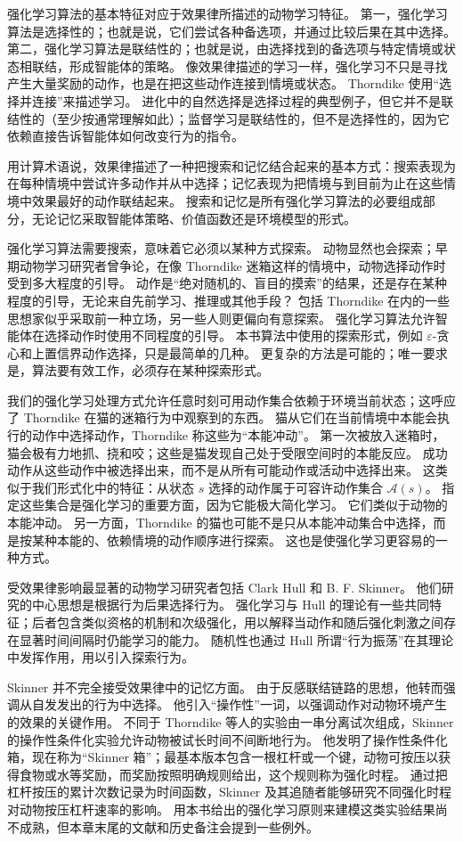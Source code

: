 \documentclass[UTF8, 12pt, fontset=fandol, oneside]{ctexart}
\begin{document}
强化学习算法的基本特征对应于效果律所描述的动物学习特征。
第一，强化学习算法是选择性的；也就是说，它们尝试各种备选项，并通过比较后果在其中选择。
第二，强化学习算法是联结性的；也就是说，由选择找到的备选项与特定情境或状态相联结，形成智能体的策略。
像效果律描述的学习一样，强化学习不只是寻找产生大量奖励的动作，也是在把这些动作连接到情境或状态。
Thorndike 使用“选择并连接”来描述学习。
进化中的自然选择是选择过程的典型例子，但它并不是联结性的（至少按通常理解如此）；监督学习是联结性的，但不是选择性的，因为它依赖直接告诉智能体如何改变行为的指令。

用计算术语说，效果律描述了一种把搜索和记忆结合起来的基本方式：搜索表现为在每种情境中尝试许多动作并从中选择；记忆表现为把情境与到目前为止在这些情境中效果最好的动作联结起来。
搜索和记忆是所有强化学习算法的必要组成部分，无论记忆采取智能体策略、价值函数还是环境模型的形式。

强化学习算法需要搜索，意味着它必须以某种方式探索。
动物显然也会探索；早期动物学习研究者曾争论，在像 Thorndike 迷箱这样的情境中，动物选择动作时受到多大程度的引导。
动作是“绝对随机的、盲目的摸索”的结果，还是存在某种程度的引导，无论来自先前学习、推理或其他手段？
包括 Thorndike 在内的一些思想家似乎采取前一种立场，另一些人则更偏向有意探索。
强化学习算法允许智能体在选择动作时使用不同程度的引导。
本书算法中使用的探索形式，例如 $\varepsilon$-贪心和上置信界动作选择，只是最简单的几种。
更复杂的方法是可能的；唯一要求是，算法要有效工作，必须存在某种探索形式。

我们的强化学习处理方式允许任意时刻可用动作集合依赖于环境当前状态；这呼应了 Thorndike 在猫的迷箱行为中观察到的东西。
猫从它们在当前情境中本能会执行的动作中选择动作，Thorndike 称这些为“本能冲动”。
第一次被放入迷箱时，猫会极有力地抓、挠和咬；这些是猫发现自己处于受限空间时的本能反应。
成功动作从这些动作中被选择出来，而不是从所有可能动作或活动中选择出来。
这类似于我们形式化中的特征：从状态 $s$ 选择的动作属于可容许动作集合 $\mathcal{A}(s)$。
指定这些集合是强化学习的重要方面，因为它能极大简化学习。
它们类似于动物的本能冲动。
另一方面，Thorndike 的猫也可能不是只从本能冲动集合中选择，而是按某种本能的、依赖情境的动作顺序进行探索。
这也是使强化学习更容易的一种方式。

受效果律影响最显著的动物学习研究者包括 Clark Hull 和 B. F. Skinner。
他们研究的中心思想是根据行为后果选择行为。
强化学习与 Hull 的理论有一些共同特征；后者包含类似资格的机制和次级强化，用以解释当动作和随后强化刺激之间存在显著时间间隔时仍能学习的能力。
随机性也通过 Hull 所谓“行为振荡”在其理论中发挥作用，用以引入探索行为。

Skinner 并不完全接受效果律中的记忆方面。
由于反感联结链路的思想，他转而强调从自发发出的行为中选择。
他引入“操作性”一词，以强调动作对动物环境产生的效果的关键作用。
不同于 Thorndike 等人的实验由一串分离试次组成，Skinner 的操作性条件化实验允许动物被试长时间不间断地行为。
他发明了操作性条件化箱，现在称为“Skinner 箱”；最基本版本包含一根杠杆或一个键，动物可按压以获得食物或水等奖励，而奖励按照明确规则给出，这个规则称为强化时程。
通过把杠杆按压的累计次数记录为时间函数，Skinner 及其追随者能够研究不同强化时程对动物按压杠杆速率的影响。
用本书给出的强化学习原则来建模这类实验结果尚不成熟，但本章末尾的文献和历史备注会提到一些例外。
\end{document}

